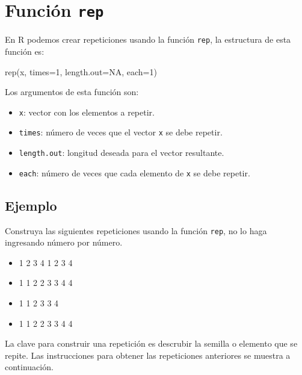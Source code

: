 \documentclass[
]{book}
\makeatletter
\newenvironment{Shaded}{\begin{snugshade}}{\end{snugshade}}
\newcommand{\AttributeTok}[1]{\textcolor[rgb]{0.77,0.63,0.00}{#1}}
\newcommand{\ConstantTok}[1]{\textcolor[rgb]{0.00,0.00,0.00}{#1}}
\newcommand{\DecValTok}[1]{\textcolor[rgb]{0.00,0.00,0.81}{#1}}
\newcommand{\FunctionTok}[1]{\textcolor[rgb]{0.00,0.00,0.00}{#1}}
\newcommand{\NormalTok}[1]{#1}
\providecommand{\tightlist}{%
  \setlength{\itemsep}{0pt}\setlength{\parskip}{0pt}}
\newenvironment{kframe}{%
\medskip{}
\setlength{\fboxsep}{.8em}
 \def\at@end@of@kframe{}%
 \ifinner\ifhmode%
  \def\at@end@of@kframe{\end{minipage}}%
  \begin{minipage}{\columnwidth}%
 \fi\fi%
 \def\FrameCommand##1{\hskip\@totalleftmargin \hskip-\fboxsep
 \colorbox{shadecolor}{##1}\hskip-\fboxsep
     \hskip-\linewidth \hskip-\@totalleftmargin \hskip\columnwidth}%
 \MakeFramed {\advance\hsize-\width
   \@totalleftmargin\z@ \linewidth\hsize
   \@setminipage}}%
 {\par\unskip\endMakeFramed%
 \at@end@of@kframe}
\renewenvironment{Shaded}{\begin{kframe}}{\end{kframe}}
\makeatother
\begin{document}
\hypertarget{funciuxf3n-rep}{%
\section{\texorpdfstring{Función \texttt{rep}}{Función rep}}\label{funciuxf3n-rep}}

En R podemos crear repeticiones usando la función \texttt{rep}, la estructura de esta función es:

\begin{Shaded}
\begin{Highlighting}[]
\FunctionTok{rep}\NormalTok{(x, }\AttributeTok{times=}\DecValTok{1}\NormalTok{, }\AttributeTok{length.out=}\ConstantTok{NA}\NormalTok{, }\AttributeTok{each=}\DecValTok{1}\NormalTok{)}
\end{Highlighting}
\end{Shaded}

Los argumentos de esta función son:

\begin{itemize}
\tightlist
\item
  \texttt{x}: vector con los elementos a repetir.
\item
  \texttt{times}: número de veces que el vector \texttt{x} se debe repetir.
\item
  \texttt{length.out}: longitud deseada para el vector resultante.
\item
  \texttt{each}: número de veces que cada elemento de \texttt{x} se debe repetir.
\end{itemize}

\hypertarget{ejemplo-11}{%
\subsection*{Ejemplo}\label{ejemplo-11}}

Construya las siguientes repeticiones usando la función \texttt{rep}, no lo haga ingresando número por número.

\begin{itemize}
\tightlist
\item
  1 2 3 4 1 2 3 4
\item
  1 1 2 2 3 3 4 4
\item
  1 1 2 3 3 4
\item
  1 1 2 2 3 3 4 4
\end{itemize}

La clave para construir una repetición es descrubir la semilla o elemento que se repite. Las instrucciones para obtener las repeticiones anteriores se muestra a continuación.
\end{document}
